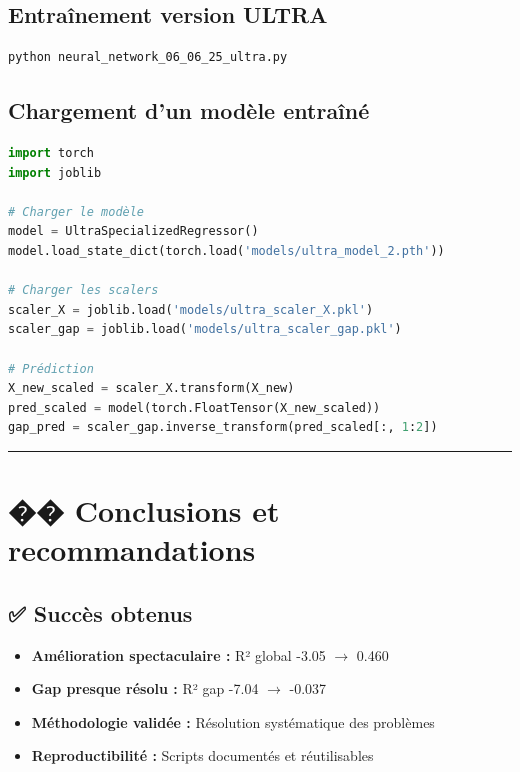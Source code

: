 \documentclass[a4paper,11pt]{article}
\begin{document}
\subsection*{Entraînement version ULTRA}
\begin{lstlisting}[language=bash]
python neural_network_06_06_25_ultra.py
\end{lstlisting}

\subsection*{Chargement d'un modèle entraîné}
\begin{lstlisting}[language=Python]
import torch
import joblib

# Charger le modèle
model = UltraSpecializedRegressor()
model.load_state_dict(torch.load('models/ultra_model_2.pth'))

# Charger les scalers
scaler_X = joblib.load('models/ultra_scaler_X.pkl')
scaler_gap = joblib.load('models/ultra_scaler_gap.pkl')

# Prédiction
X_new_scaled = scaler_X.transform(X_new)
pred_scaled = model(torch.FloatTensor(X_new_scaled))
gap_pred = scaler_gap.inverse_transform(pred_scaled[:, 1:2])
\end{lstlisting}

\vspace{1em}
\hrule
\vspace{1em}


\section*{\large �� Conclusions et recommandations}

\subsection*{✅ Succès obtenus}
\begin{itemize}
  \item \textbf{Amélioration spectaculaire :} R² global -3.05 $\rightarrow$ 0.460
  \item \textbf{Gap presque résolu :} R² gap -7.04 $\rightarrow$ -0.037
  \item \textbf{Méthodologie validée :} Résolution systématique des problèmes
  \item \textbf{Reproductibilité :} Scripts documentés et réutilisables
\end{itemize}
\end{document}
